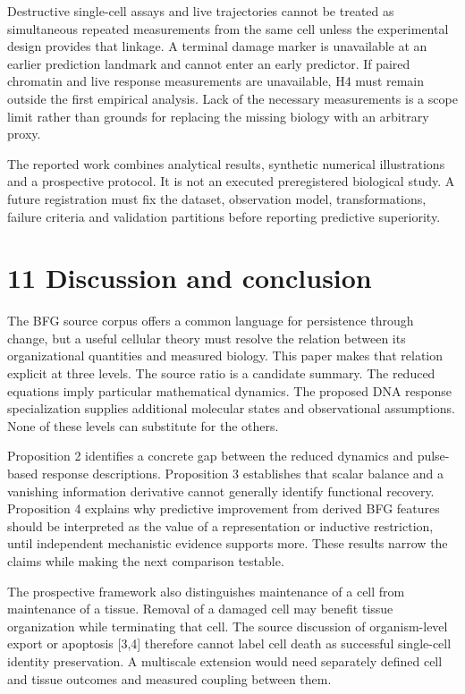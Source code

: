 \documentclass[11pt,a4paper]{article}
\begin{document}
Destructive single-cell assays and live trajectories cannot be treated as simultaneous repeated measurements from the same cell unless the experimental design provides that linkage. A terminal damage marker is unavailable at an earlier prediction landmark and cannot enter an early predictor. If paired chromatin and live response measurements are unavailable, H4 must remain outside the first empirical analysis. Lack of the necessary measurements is a scope limit rather than grounds for replacing the missing biology with an arbitrary proxy.

The reported work combines analytical results, synthetic numerical illustrations and a prospective protocol. It is not an executed preregistered biological study. A future registration must fix the dataset, observation model, transformations, failure criteria and validation partitions before reporting predictive superiority.

\section*{11 Discussion and conclusion}
The BFG source corpus offers a common language for persistence through change, but a useful cellular theory must resolve the relation between its organizational quantities and measured biology. This paper makes that relation explicit at three levels. The source ratio is a candidate summary. The reduced equations imply particular mathematical dynamics. The proposed DNA response specialization supplies additional molecular states and observational assumptions. None of these levels can substitute for the others.

Proposition 2 identifies a concrete gap between the reduced dynamics and pulse-based response descriptions. Proposition 3 establishes that scalar balance and a vanishing information derivative cannot generally identify functional recovery. Proposition 4 explains why predictive improvement from derived BFG features should be interpreted as the value of a representation or inductive restriction, until independent mechanistic evidence supports more. These results narrow the claims while making the next comparison testable.

The prospective framework also distinguishes maintenance of a cell from maintenance of a tissue. Removal of a damaged cell may benefit tissue organization while terminating that cell. The source discussion of organism-level export or apoptosis [3,4] therefore cannot label cell death as successful single-cell identity preservation. A multiscale extension would need separately defined cell and tissue outcomes and measured coupling between them.
\end{document}
